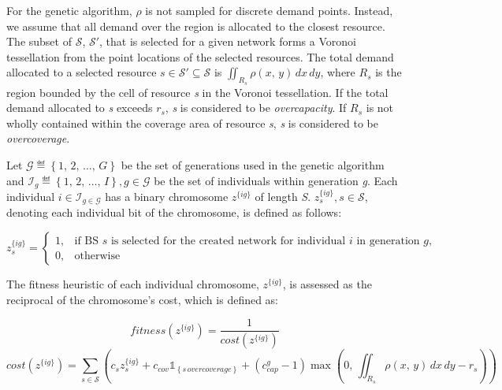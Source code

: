 \documentclass[12pt,onecolumn]{IEEEtran}
\begin{document}
For the genetic algorithm, $\rho$ is not sampled for discrete demand points.  Instead, we assume that all demand over the region is allocated to the closest resource.  The subset of $\mathcal{S}$, $\mathcal{S}'$, that is selected for a given network forms a Voronoi tessellation from the point locations of the selected resources.  The total demand allocated to a selected resource $s \in \mathcal{S}' \subseteq \mathcal{S}$ is $\iint_{R_s} \rho\left(x,\, y\right) \,dx \,dy$, where $R_s$ is the region bounded by the cell of resource \textit{s} in the Voronoi tessellation.  If the total demand allocated to \textit{s} exceeds $r_s$, \textit{s} is considered to be \textit{overcapacity}.  If $R_s$ is not wholly contained within the coverage area of resource \textit{s}, \textit{s} is considered to be \textit{overcoverage}.

Let $\mathcal{G} \eqdef \left\{1,\, 2,\, \ldots,\, G\right\}$ be the set of generations used in the genetic algorithm and $\mathcal{I}_g \eqdef \left\{1,\, 2,\, \ldots,\, I\right\}, g \in \mathcal{G}$ be the set of individuals within generation \textit{g}.  Each individual $i \in \mathcal{I}_{g \in \mathcal{G}}$ has a binary chromosome $z^{\{ig\}}$ of length \textit{S}.  $z_s^{\{ig\}}, s \in \mathcal{S}$, denoting each individual bit of the chromosome, is defined as follows:

\[ z_s^{\{ig\}} =
	\begin{cases}
		1,& \text{if BS $s$ is selected for the created network for individual $i$ in generation $g$,}\\
		0,& \text{otherwise}
	\end{cases}
\]

The fitness heuristic of each individual chromosome, $z^{\{ig\}}$, is assessed as the reciprocal of the chromosome's cost, which is defined as:

\begin{equation} \label{eq:GAFit}
fitness\left(z^{\{ig\}}\right) = \frac{1}{cost\left(z^{\{ig\}}\right)}
\end{equation}
\begin{equation} \label{eq:GACost}
cost\left(z^{\{ig\}}\right) = \sum_{s \in \mathcal{S}} \left( c_s z_s^{\{ig\}} + c_{cov}  \mathbb{1}_{\left\{ s\, overcoverage \right\}} + \left(c_{cap}^g - 1\right) \max\left( 0,\, \iint_{R_s} \rho\left(x,\, y\right)\, dx\, dy - r_s \right) \right)
\end{equation}
\end{document}
